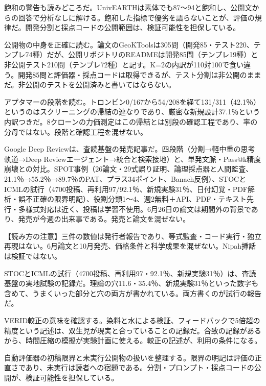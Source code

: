 \documentclass[lualatex,a4paper,10pt]{jlreq}
\begin{document}
飽和の警告も読みどころだ。UnivEARTHは素体でも87〜94と飽和し、公開文からの回答で分析なしに解ける。飽和した指標で優劣を語らないことが、評価の規律だ。開発分割と採点コードの公開範囲は、検証可能性を担保している。
\cite{B47,B84,B48}


公開物の中身を正確に読む。論文のGeoKToolsは305問（開発85・テスト220、テンプレ74種）だが、公開リポジトリのREADMEは開発85問（テンプレ19種）と非公開テスト210問（テンプレ72種）と記す。K=2の内訳が110対100で食い違う。開発85問と評価器・採点コードは取得できるが、テスト分割は非公開のままだ。非公開のテストを公開済みと書いてはならない。
\cite{B47,B84,B48}


アプタマーの段階を読む。トロンビン0/167から54/208を経て131/311（42.1％）というのはスクリーニングの帰結の連なりであり、厳密な新規設計37.1％という内訳つきだ。8クローンの力価測定はこの帰結とは別段の確認工程であり、率の分母ではない。段階と確認工程を混ぜない。
\cite{B46,B83,B44,B43,B45}


Google Deep Reviewは、査読基盤の発売記事だ。四段階（分割→軽中重の思考軌道→Deep Reviewエージェント→統合と検索接地）と、単発文脈・Pass@k精度崩壊との対比。SPOT事例（26論文・29式誤り証明、論理採点器と人間監査、21.1％→55.2％→89.7％のPAT、プラス34ポイント、Banach反例）、STOCとICMLの試行（4700投稿、再利用97/92.1％、新規実験31％、日付幻覚・PDF解析・誤不正確の限界明記）、役割分類1〜4、週2無料＋API、PDF・テキスト先行・多様式対応は近く、投稿は学習不使用。6月26日の論文は期間外の背景であり、発売が今週の出来事である。発売と論文を混ぜない。
\cite{B50,B85,B49}


\begin{tcolorbox}[colback=SurveySoft,colframe=SurveyRule,arc=1mm,boxrule=0.4pt,left=2mm,right=2mm]
【読み方の注意】三件の数値は発行者報告であり、等式監査・コード実行・独立再現はない。6月論文と10月発売、価格条件と科学成果を混ぜない。Nipah挿話は検証ではない。
\end{tcolorbox}
\cite{B46,B83,B44,B43,B45,B47,B84,B48}


STOCとICMLの試行（4700投稿、再利用97・92.1％、新規実験31％）は、査読基盤の実地試験の記録だ。理論の穴11.6・35.4％、新規実験31％といった数字も含めて、うまくいった部分と穴の両方が書かれている。両方書くのが試行の報告だ。
\cite{B50,B85,B49}


VERID較正の意味を確認する。染料と水による検証、フィードバックで5倍超の精度という記述は、双生児が現実と合っていることの記録だ。合致の記録があるから、時間圧縮の模擬が実験計画に使える。較正の記述が、利用の条件になる。
\cite{B46,B83,B44,B43,B45}


自動評価器の初稿限界と未実行公開物の扱いを整理する。限界の明記は評価の正直さであり、未実行は読者への宿題である。分割・プロンプト・採点コードの公開が、検証可能性を担保している。
\cite{B47,B84,B48}
\end{document}
